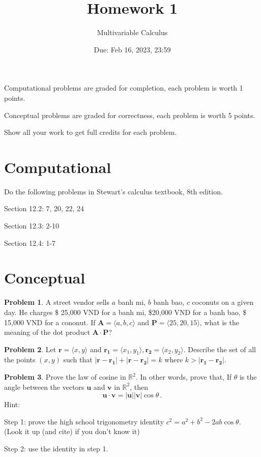 \documentclass[12pt]{article}
\title{Homework 1}
\author{ Multivariable Calculus}
\date{Due: Feb 16, 2023, 23:59}
\newcommand{\vect}{\mathbf}
\theoremstyle{definition}
\newtheorem{problem}{Problem}
\begin{document}
\maketitle

Computational problems are graded for completion, each problem is worth 1 points.

Conceptual problems are graded for correctness, each problem is worth 5 points.

Show all your work to get full credits for each problem.
\section{Computational}
Do the following problems in Stewart's calculus textbook, 8th edition.

Section 12.2: 7, 20, 22, 24

Section 12.3: 2-10

Section 12.4: 1-7

\section{Conceptual}

\begin{problem}
    A street vendor sells $a$ banh mi, $b$ banh bao, $c$ coconuts
    on a given day.
    He charges \$ 25,000 VND for a banh mi, \$20,000 VND for a banh bao, 
    \$ 15,000 VND for a cononut.
    If $\vect{A} = \langle a,b,c \rangle$ and $\vect{P} = \langle 25, 20,15 \rangle$, what is the meaning of the dot product $\vect{A}\cdot \vect{P}$?
\end{problem}

\begin{problem}
    Let $\vect{r} = \langle x,y \rangle$ and 
    $\vect{r_1} = \langle x_1, y_1 \rangle, 
    \vect{r_2} = \langle x_2, y_2 \rangle$.
    Describe the set of all the points $(x,y)$
    such that
    $| \vect{r}- \vect{r_1} | + | \vect{r} - \vect{r_2} | = k$
    where 
    $k > | \vect{r_1} - \vect{r_2}|$.
\end{problem}

\begin{problem}
     Prove the law of cosine in $\mathbb{R}^2$. In other words,
        prove that, 
        If $\theta$ is the angle between the vectors $\textbf{u}$ and $\textbf{v}$ in $\mathbb{R}^2$, then
   \begin{equation*}
        \textbf{u}\cdot \textbf{v} = |\textbf{u}|| \textbf{v}| \cos \theta \,.
   \end{equation*}
 Hint: 

 Step 1: prove the high school trigonometry identity $c^2 = a^2 + b^2 - 2ab\cos\theta$. (Look it up (and cite) if you don't know it)

 Step 2: use the identity in step 1.

\end{problem}
\end{document}

